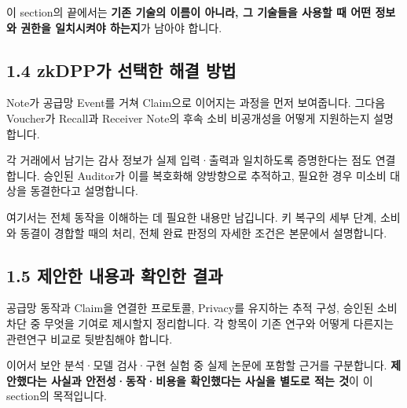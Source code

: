 이 section의 끝에서는 \textbf{기존 기술의 이름이 아니라, 그 기술들을 사용할 때 어떤 정보와 권한을 일치시켜야 하는지}가 남아야 합니다.

\subsection*{1.4 zkDPP가 선택한 해결 방법}
Note가 공급망 Event를 거쳐 Claim으로 이어지는 과정을 먼저 보여줍니다.
그다음 Voucher가 Recall과 Receiver Note의 후속 소비 비공개성을 어떻게 지원하는지 설명합니다.

각 거래에서 남기는 감사 정보가 실제 입력·출력과 일치하도록 증명한다는 점도 연결합니다.
승인된 Auditor가 이를 복호화해 양방향으로 추적하고, 필요한 경우 미소비 대상을 동결한다고 설명합니다.

여기서는 전체 동작을 이해하는 데 필요한 내용만 남깁니다.
키 복구의 세부 단계, 소비와 동결이 경합할 때의 처리, 전체 완료 판정의 자세한 조건은 본문에서 설명합니다.

\subsection*{1.5 제안한 내용과 확인한 결과}
공급망 동작과 Claim을 연결한 프로토콜, Privacy를 유지하는 추적 구성, 승인된 소비 차단 중 무엇을 기여로 제시할지 정리합니다.
각 항목이 기존 연구와 어떻게 다른지는 관련연구 비교로 뒷받침해야 합니다.

이어서 보안 분석·모델 검사·구현 실험 중 실제 논문에 포함할 근거를 구분합니다.
\textbf{제안했다는 사실과 안전성·동작·비용을 확인했다는 사실을 별도로 적는 것}이 이 section의 목적입니다.
